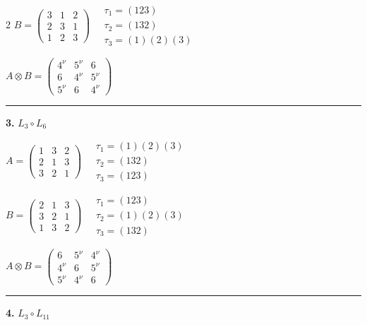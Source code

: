 \begin{multicols}{2}
$B = \begin{pmatrix} 3 & 1 & 2 \\ 2 & 3 & 1 \\ 1 & 2 & 3 \end{pmatrix} \quad \begin{matrix} \tau_{1}=(1 2 3) \\ \tau_{2}=(1 3 2) \\ \tau_{3}=(1)(2)(3) \end{matrix}$

$A \otimes B = \begin{pmatrix} 4^\nu & 5^\nu & 6 \\ 6 & 4^\nu & 5^\nu \\ 5^\nu & 6 & 4^\nu \end{pmatrix}$

\vspace{0.3em}
\hrule
\vspace{0.3em}

\noindent\textbf{3.} $L_{3} \circ L_{6}$

$A = \begin{pmatrix} 1 & 3 & 2 \\ 2 & 1 & 3 \\ 3 & 2 & 1 \end{pmatrix} \quad \begin{matrix} \tau_{1}=(1)(2)(3) \\ \tau_{2}=(1 3 2) \\ \tau_{3}=(1 2 3) \end{matrix}$

$B = \begin{pmatrix} 2 & 1 & 3 \\ 3 & 2 & 1 \\ 1 & 3 & 2 \end{pmatrix} \quad \begin{matrix} \tau_{1}=(1 2 3) \\ \tau_{2}=(1)(2)(3) \\ \tau_{3}=(1 3 2) \end{matrix}$

$A \otimes B = \begin{pmatrix} 6 & 5^\nu & 4^\nu \\ 4^\nu & 6 & 5^\nu \\ 5^\nu & 4^\nu & 6 \end{pmatrix}$

\vspace{0.3em}
\hrule
\vspace{0.3em}

\noindent\textbf{4.} $L_{3} \circ L_{11}$


\end{multicols}
